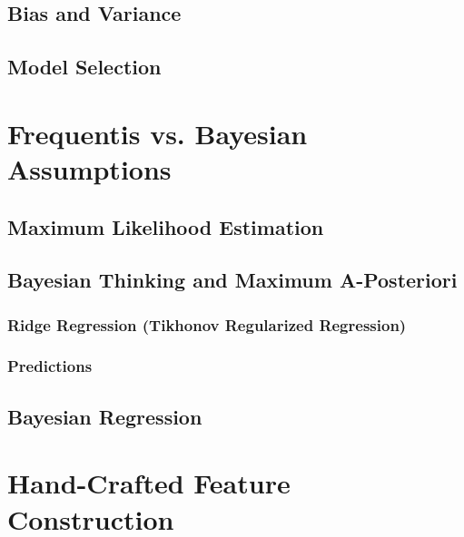 		\subsection{Bias and Variance} %

		\subsection{Model Selection} %

	\section{Frequentis vs. Bayesian Assumptions} %

		\subsection{Maximum Likelihood Estimation} %

		\subsection{Bayesian Thinking and Maximum A-Posteriori} %

			\subsubsection{Ridge Regression (Tikhonov Regularized Regression)} %

			\subsubsection{Predictions} %

		\subsection{Bayesian Regression} %

	\section{Hand-Crafted Feature Construction} %


